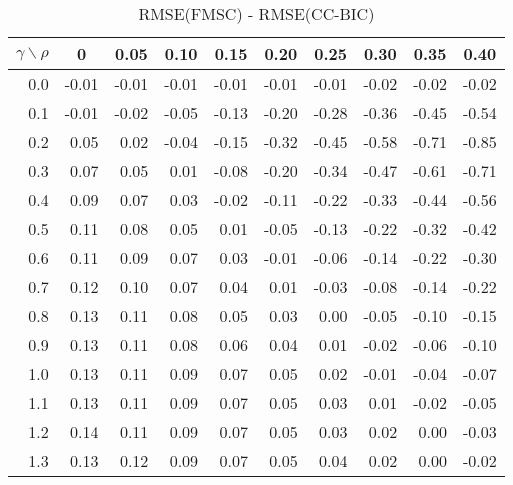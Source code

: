 \documentclass[12pt]{article}
\begin{document}
%
\begin{table}[!tbp]
\caption{RMSE(FMSC) - RMSE(CC-BIC)}
 \begin{center}
 \begin{tabular}{r|rrrrrrrrr}\hline\hline
\multicolumn{1}{c|}{$\gamma\backslash\rho$}&\multicolumn{1}{c}{0}&\multicolumn{1}{c}{0.05}&\multicolumn{1}{c}{0.10}&\multicolumn{1}{c}{0.15}&\multicolumn{1}{c}{0.20}&\multicolumn{1}{c}{0.25}&\multicolumn{1}{c}{0.30}&\multicolumn{1}{c}{0.35}&\multicolumn{1}{c}{0.40}\tabularnewline
\hline
0.0&-0.01&-0.01&-0.01&-0.01&-0.01&-0.01&-0.02&-0.02&-0.02\tabularnewline
0.1&-0.01&-0.02&-0.05&-0.13&-0.20&-0.28&-0.36&-0.45&-0.54\tabularnewline
0.2& 0.05& 0.02&-0.04&-0.15&-0.32&-0.45&-0.58&-0.71&-0.85\tabularnewline
0.3& 0.07& 0.05& 0.01&-0.08&-0.20&-0.34&-0.47&-0.61&-0.71\tabularnewline
0.4& 0.09& 0.07& 0.03&-0.02&-0.11&-0.22&-0.33&-0.44&-0.56\tabularnewline
0.5& 0.11& 0.08& 0.05& 0.01&-0.05&-0.13&-0.22&-0.32&-0.42\tabularnewline
0.6& 0.11& 0.09& 0.07& 0.03&-0.01&-0.06&-0.14&-0.22&-0.30\tabularnewline
0.7& 0.12& 0.10& 0.07& 0.04& 0.01&-0.03&-0.08&-0.14&-0.22\tabularnewline
0.8& 0.13& 0.11& 0.08& 0.05& 0.03& 0.00&-0.05&-0.10&-0.15\tabularnewline
0.9& 0.13& 0.11& 0.08& 0.06& 0.04& 0.01&-0.02&-0.06&-0.10\tabularnewline
1.0& 0.13& 0.11& 0.09& 0.07& 0.05& 0.02&-0.01&-0.04&-0.07\tabularnewline
1.1& 0.13& 0.11& 0.09& 0.07& 0.05& 0.03& 0.01&-0.02&-0.05\tabularnewline
1.2& 0.14& 0.11& 0.09& 0.07& 0.05& 0.03& 0.02& 0.00&-0.03\tabularnewline
1.3& 0.13& 0.12& 0.09& 0.07& 0.05& 0.04& 0.02& 0.00&-0.02\tabularnewline
\hline
\end{tabular}

\end{center}

\end{table}
\end{document}
